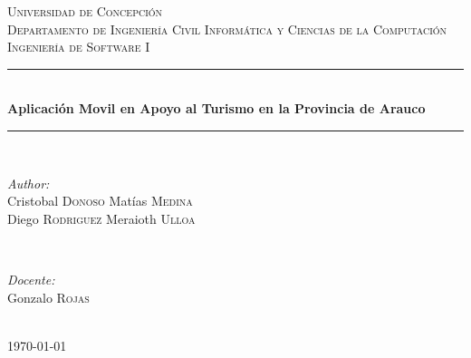 \documentclass[12pt]{article}
\begin{document}
\begin{titlepage}

\newcommand{\HRule}{\rule{\linewidth}{0.5mm}} %

\center %
 

\textsc{\LARGE Universidad de Concepción}\\[1.5cm] %
\textsc{\Large Departamento de Ingeniería Civil Informática y Ciencias de la Computación}\\[0.5cm] %
\textsc{\large Ingeniería de Software I}\\[0.5cm] %


\HRule \\[0.4cm]
{ \huge \bfseries Aplicación Movil en Apoyo al Turismo en la Provincia de Arauco }\\[0.4cm] %
\HRule \\[1.5cm]
 

\begin{minipage}{0.4\textwidth}
\begin{flushleft} \large
\emph{Author:}\\
Cristobal \textsc{Donoso}
Matías \textsc{Medina}\\
Diego \textsc{Rodriguez}
Meraioth \textsc{Ulloa}
\end{flushleft}
\end{minipage}
~
\begin{minipage}{0.4\textwidth}
\begin{flushright} \large
\emph{Docente:} \\
Gonzalo \textsc{Rojas} %
\end{flushright}
\end{minipage}\\[4cm]

{\large \today}\\[3cm] %
\vfill %
\end{titlepage}
\end{document}
